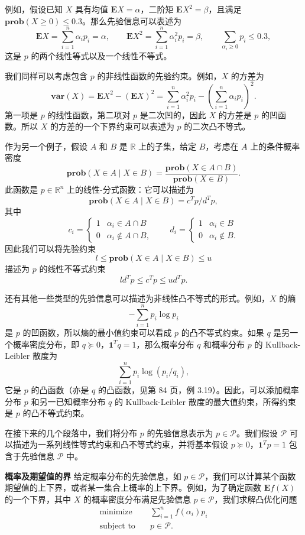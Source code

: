 \documentclass[UTF8, 12pt, fontset=fandol, oneside]{ctexart}
\begin{document}
例如，假设已知 $X$ 具有均值 $\mathbf{E}X=\alpha$，二阶矩 $\mathbf{E}X^2=\beta$，且满足 $\mathbf{prob}(X\geq 0)\leq 0.3$。那么先验信息可以表述为
\[
\mathbf{E}X=\sum_{i=1}^n \alpha_i p_i=\alpha,\qquad
\mathbf{E}X^2=\sum_{i=1}^n \alpha_i^2 p_i=\beta,\qquad
\sum_{\alpha_i\geq 0}p_i\leq 0.3,
\]
这是 $p$ 的两个线性等式以及一个线性不等式。

我们同样可以考虑包含 $p$ 的非线性函数的先验约束。例如，$X$ 的方差为
\[
\mathbf{var}(X)=\mathbf{E}X^2-(\mathbf{E}X)^2
=\sum_{i=1}^n \alpha_i^2p_i-\left(\sum_{i=1}^n\alpha_i p_i\right)^2.
\]
第一项是 $p$ 的线性函数，第二项对 $p$ 是二次凹的，因此 $X$ 的方差是 $p$ 的凹函数。所以 $X$ 的方差的一个下界约束可以表述为 $p$ 的二次凸不等式。

作为另一个例子，假设 $A$ 和 $B$ 是 $\mathbb{R}$ 上的子集，给定 $B$，考虑在 $A$ 上的条件概率密度
\[
\mathbf{prob}(X\in A\mid X\in B)=\frac{\mathbf{prob}(X\in A\cap B)}{\mathbf{prob}(X\in B)}.
\]
此函数是 $p\in\mathbb{R}^n$ 上的线性-分式函数：它可以描述为
\[
\mathbf{prob}(X\in A\mid X\in B)=c^Tp/d^Tp,
\]
其中
\[
c_i=
\begin{cases}
1 & \alpha_i\in A\cap B\\
0 & \alpha_i\notin A\cap B,
\end{cases}
\qquad
d_i=
\begin{cases}
1 & \alpha_i\in B\\
0 & \alpha_i\notin B.
\end{cases}
\]
因此我们可以将先验约束
\[
l\leq \mathbf{prob}(X\in A\mid X\in B)\leq u
\]
描述为 $p$ 的线性不等式约束
\[
ld^Tp\leq c^Tp\leq ud^Tp.
\]

还有其他一些类型的先验信息可以描述为非线性凸不等式的形式。例如，$X$ 的熵
\[
-\sum_{i=1}^n p_i\log p_i
\]
是 $p$ 的凹函数，所以熵的最小值约束可以看成 $p$ 的凸不等式约束。如果 $q$ 是另一个概率密度分布，即 $q\succeq 0$，$\mathbf{1}^Tq=1$，那么概率分布 $q$ 和概率分布 $p$ 的 Kullback-Leibler 散度为
\[
\sum_{i=1}^n p_i\log(p_i/q_i),
\]
它是 $p$ 的凸函数（亦是 $q$ 的凸函数，见第 84 页，例 3.19）。因此，可以添加概率分布 $p$ 和另一已知概率分布 $q$ 的 Kullback-Leibler 散度的最大值约束，所得约束是 $p$ 的凸不等式约束。

在接下来的几个段落中，我们将分布 $p$ 的先验信息表示为 $p\in\mathcal{P}$。我们假设 $\mathcal{P}$ 可以描述为一系列线性等式约束和凸不等式约束，并将基本假设 $p\succeq 0$，$\mathbf{1}^Tp=1$ 包含于先验信息 $\mathcal{P}$ 中。

\noindent\textbf{概率及期望值的界}\quad
给定概率分布的先验信息，如 $p\in\mathcal{P}$，我们可以计算某个函数期望值的上下界，或者某一集合上概率的上下界。例如，为了确定函数 $\mathbf{E}f(X)$ 的一个下界，其中 $X$ 的概率密度分布满足先验信息 $p\in\mathcal{P}$，我们求解凸优化问题
\[
\begin{aligned}
\text{minimize}\quad & \sum_{i=1}^n f(\alpha_i)p_i\\
\text{subject to}\quad & p\in\mathcal{P}.
\end{aligned}
\]
\end{document}
